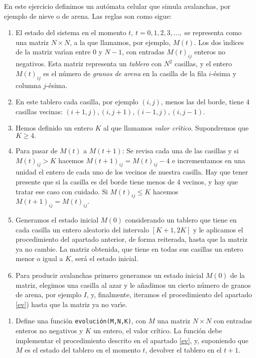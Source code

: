 \begin{ejer}
 En este ejercicio definimos un aut\'omata celular que
simula avalanchas, por ejemplo de nieve o de arena. Las reglas son como sigue:
  
  \begin{enumerate}%
  \item El estado del sistema en el momento $t,\ t=0,1,2,3,\dots,$ se representa
como una matriz $N\times N$, a la que llamamos,  por ejemplo,  $M(t)$. Los dos
\'{\i}ndices de la matriz var\'{\i}an entre $0$ y $N-1$,  con entradas
$M(t)_{ij}$ enteros no negativos. Esta matriz representa un {\itshape tablero} 
con
$N^2$ casillas, y el entero $M(t)_{ij}$ es el n\'umero de {\itshape granos de 
arena} en
la casilla de la fila $i$-\'esima y columna $j$-\'esima.
\item En este tablero cada casilla, por ejemplo $(i,j)$,  menos las del borde, 
tiene $4$ casillas vecinas: $(i+1,j),(i,j+1),(i-1,j),(i,j-1).$
\item Hemos definido un entero $K$ al que llamamos {\itshape valor 
cr\'{\i}tico}. Supondremos que $K\ge 4.$
\item Para \label{ev}pasar de $M(t)$ a $M(t+1)$:
Se revisa cada una de las casillas y si
$M(t)_{ij}>K$ hacemos $M(t+1)_{ij}=M(t)_{ij}-4$ e incrementamos en una unidad el
entero de cada uno de los vecinos de nuestra casilla. Hay que tener presente que
si la casilla es del borde tiene menos de $4$ vecinos, y hay que tratar ese caso
con cuidado. 
Si $M(t)_{ij}\le K$ hacemos $M(t+1)_{ij}=M(t)_{ij}.$
\item \label{ini}Generamos el estado inicial $M(0)$ considerando un tablero que
tiene en cada casilla un entero aleatorio del intervalo $[K+1,2K]$ y le
aplicamos el procedimiento del apartado anterior, de forma reiterada,  hasta que
la matriz ya no cambie. La matriz obtenida, que tiene en todas sus casillas un
entero menor o igual a $K$, ser\'a el estado inicial. 

\item \label{avalan}Para producir avalanchas primero generamos un estado inicial
$M(0)$ de la matriz,   elegimos una casilla al azar y le a\~nadimos un cierto
n\'umero de granos de arena, por ejemplo $I$, y, finalmente, iteramos  el
procedimiento del apartado {\ref{ev})} hasta que la matriz ya no var\'{\i}e. 

 \end{enumerate}
 
 
 
 \begin{enumerate}
  \item  {\sc Define} una funci\'on {\tt evoluci\'on(M,N,K)}, con $M$
una matriz $N\times N$ con entradas enteros no negativos y $K$ un entero, el
valor cr\'itico. La funci\'on debe implementar el procedimiento descrito en el
apartado  {\ref{ev}}, y, suponiendo que $M$ es el estado del tablero en el
momento $t$,  devolver el tablero en el $t+1.$ 
  

\end{enumerate}
\end{ejer}
